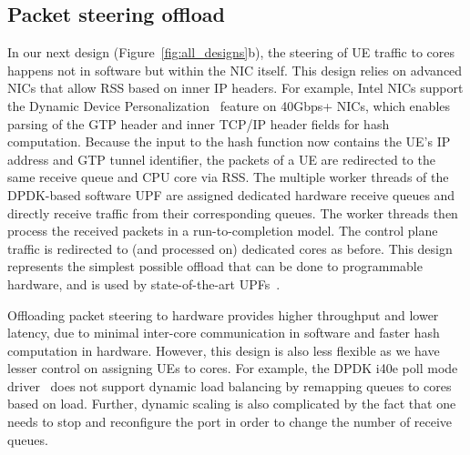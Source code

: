 \vspace{-8pt}
\subsection{Packet steering offload}
\label{sub:steerOffload}

In our next design (Figure~\ref{fig:all_designs}b), the steering of UE traffic to cores happens not in software but within the NIC itself. This design relies on advanced NICs that allow RSS based on inner IP headers. For example, Intel NICs support the Dynamic Device Personalization~\cite{ddpGuide} feature on 40Gbps+ NICs,  which enables parsing of the GTP header and inner TCP/IP header fields for hash computation. Because the input to the hash function now contains the UE's IP address and GTP tunnel identifier, the packets of a UE are redirected to the same receive queue and CPU core via RSS. The multiple worker threads of the DPDK-based software UPF are assigned dedicated hardware receive queues and directly receive traffic from their corresponding queues. The worker threads then process the received packets in a run-to-completion model. The control plane traffic is redirected to (and processed on) dedicated cores as before. This design represents the simplest possible offload that can be done to programmable hardware, and is used by state-of-the-art UPFs~\cite{astri, intel_wp, mavenir, metaswitch}. 

Offloading packet steering to hardware provides higher throughput and lower latency, due to minimal inter-core communication in software and faster hash computation in hardware. However, this design is also less flexible as we have lesser control on assigning UEs to cores. For example, the DPDK i40e poll mode driver~\cite{i40eDriver} does not support dynamic load balancing by remapping queues to cores based on load. Further, dynamic scaling is also complicated by the fact that one needs to stop and reconfigure the port in order to change the number of receive queues.


